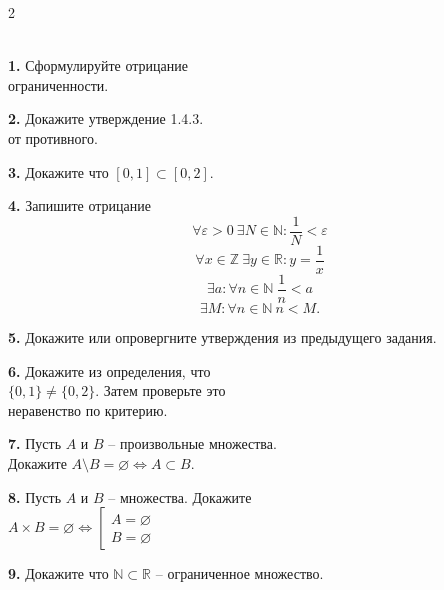 \begin{multicols}{2}
\begin{exercise}
\ \\
\noindent\textbf{1.}
Сформулируйте отрицание\\
ограниченности.

\medskip\noindent\textbf{2.}
Докажите утверждение 1.4.3.\\от противного.

\medskip\noindent\textbf{3.}
Докажите что $[0,1]\subset[0,2]$.

\medskip\noindent\textbf{4.}
Запишите отрицание\\
\[\forall \varepsilon>0\ \exists N\in\mathbb{N}\colon \frac{1}{N}<\varepsilon\]
\[\forall x\in\mathbb{Z}\ \exists y\in\mathbb{R}\colon y = \frac{1}{x}\]
\[\exists a\colon\forall n\in\mathbb{N}\ \frac{1}{n}<a\]
\[\exists M\colon\forall n\in\mathbb{N}\ n<M.\]

\medskip\noindent\textbf{5.}
Докажите или опровергните утверждения из предыдущего задания.

\medskip\noindent\textbf{6.}
Докажите из определения, что\\ $\{0,1\}\neq\{0,2\}$.
Затем проверьте это\\ неравенство по критерию.

\medskip\noindent\textbf{7.}
Пусть $A$ и $B$ -- произвольные множества.\\
Докажите $A\setminus B=\varnothing \iff A\subset B$.

\medskip\noindent\textbf{8.}
Пусть $A$ и $B$ -- множества. Докажите\\
$A\times B=\varnothing \iff
\left[
\begin{gathered}
A=\varnothing\\ 
B=\varnothing
\end{gathered}
\right.$

\medskip\noindent\textbf{9.}
Докажите что $\mathbb{N}\subset\mathbb{R}$ -- ограниченное множество.
\end{exercise}
\end{multicols}
